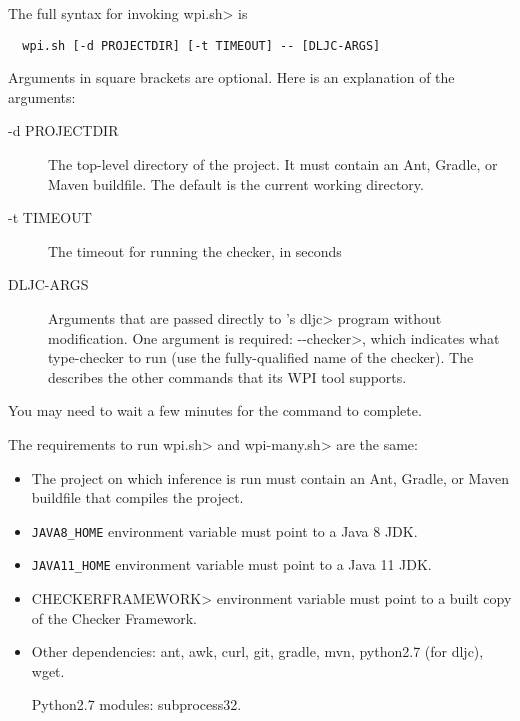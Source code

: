 The full syntax for invoking \<wpi.sh> is

\begin{Verbatim}
  wpi.sh [-d PROJECTDIR] [-t TIMEOUT] -- [DLJC-ARGS]
\end{Verbatim}

Arguments in square brackets are optional.
Here is an explanation of the arguments:

\begin{description}
\item[-d PROJECTDIR]
  The top-level directory of the project.  It must contain an Ant, Gradle,
  or Maven buildfile. The default is the current working directory.

\item[-t TIMEOUT]
  The timeout for running the checker, in seconds

\item[DLJC-ARGS]
  Arguments that are passed directly to
  's
  \<dljc> program without
  modification.  One argument is required: \<-\relax-checker>, which indicates
  what type-checker to run (use the fully-qualified name of the checker).
  The 
  describes the other commands that its WPI tool supports.
\end{description}

You may need to wait a few minutes for the command to complete.



The requirements to run \<wpi.sh> and \<wpi-many.sh> are the same:

\begin{itemize}
\item The project on which inference is run must contain an Ant, Gradle,
  or Maven buildfile that compiles the project.
\item \verb|JAVA8_HOME| environment variable must point to a Java 8 JDK.
\item \verb|JAVA11_HOME| environment variable must point to a Java 11 JDK.
\item \<CHECKERFRAMEWORK> environment variable must point to a built copy of the Checker Framework.
\item Other dependencies:
  ant,
  awk,
  curl,
  git,
  gradle,
  mvn,
  python2.7 (for dljc),
  wget.

  Python2.7 modules:
  subprocess32.
\end{itemize}



